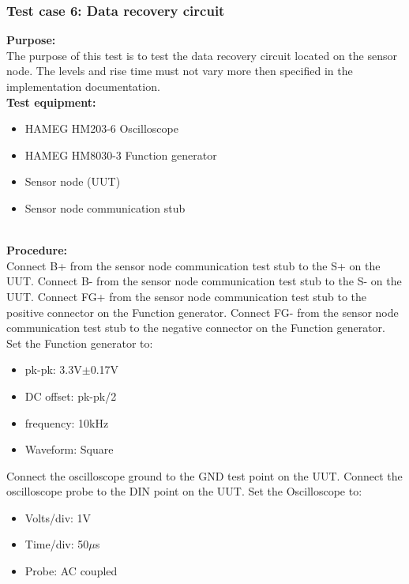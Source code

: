 \subsubsection{Test case 6: Data recovery circuit}
\textbf{Purpose:}\\
The purpose of this test is to test the data recovery circuit located on the sensor node. The levels and rise time must not vary more then specified in the implementation documentation.\\

\textbf{Test equipment:}
\begin{itemize}
\item HAMEG HM203-6 Oscilloscope
\item HAMEG HM8030-3 Function generator
\item Sensor node (UUT)
\item Sensor node communication stub
\end{itemize}
\ \\
\textbf{Procedure:}\\
Connect B+ from the sensor node communication test stub to the S+ on the UUT. Connect B- from the sensor node communication test stub to the S- on the UUT.
Connect FG+ from the sensor node communication test stub to the positive connector on the Function generator. Connect FG- from the sensor node communication test stub to the negative connector on the Function generator.\\ Set the Function generator to:
\begin{itemize}
\item pk-pk: 3.3V$\pm$0.17V
\item DC offset: pk-pk/2
\item frequency: 10kHz
\item Waveform: Square
\end{itemize}
Connect the oscilloscope ground to the GND test point on the UUT.
Connect the oscilloscope probe to the DIN point on the UUT.
Set the Oscilloscope to:
\begin{itemize}
\item Volts/div: 1V
\item Time/div: 50$\mu$s
\item Probe: AC coupled
\end{itemize}
